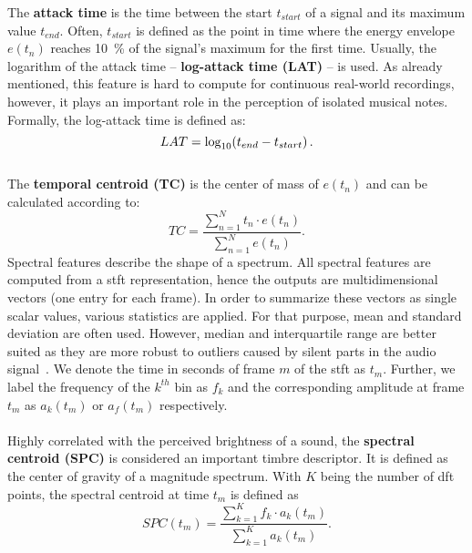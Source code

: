 The \textbf{attack time} is the time between the start $t_{start}$ of a signal and its maximum value $t_{end}$. Often, $t_{start}$ is defined as the point in time where the energy envelope $e(t_n)$ reaches \SI{10}{\percent} of the signal's maximum for the first time. Usually, the logarithm of the attack time -- \textbf{log-attack time (LAT)} -- is used. As already mentioned, this feature is hard to compute for continuous real-world recordings, however, it plays an important role in the perception of isolated musical notes. Formally, the log-attack time is defined as:
\begin{equation}
LAT = \text{log}_{10}\!\left(t_{end} - t_{start}\right).
\end{equation}\\

The \textbf{temporal centroid (TC)} is the center of mass of $e(t_n)$ and can be calculated according to:
\begin{equation}
	TC = \frac{\displaystyle \sum_{n=1}^{N} t_n \cdot e(t_n)}{\displaystyle \sum_{n=1}^{N} e(t_n)}.
\end{equation}
Spectral features describe the shape of a spectrum. All spectral features are computed from a \gls{stft} representation, hence the outputs are multidimensional vectors (one entry for each frame). In order to summarize these vectors as single scalar values, various statistics are applied. For that purpose, mean and standard deviation are often used. However, median and interquartile range are better suited as they are more robust to outliers caused by silent parts in the audio signal~\cite{peeters2011timbre}. We denote the time in seconds of frame $m$ of the \gls{stft} as $t_m$. Further, we label the frequency of the $k^{th}$ bin as $f_k$ and the corresponding amplitude at frame $t_m$ as $a_k(t_m)$ or $a_f(t_m)$ respectively.\\~\\

Highly correlated with the perceived brightness of a sound, the \textbf{spectral centroid (SPC)} is considered an important timbre descriptor. It is defined as the center of gravity of a magnitude spectrum. With $K$ being the number of \gls{dft} points, the spectral centroid at time $t_m$ is defined as
\begin{equation}
SPC(t_m) = \frac{\displaystyle \sum_{k=1}^{K} f_k \cdot a_k(t_m)}{\displaystyle \sum_{k=1}^{K} a_k(t_m)}.
\end{equation}\\

